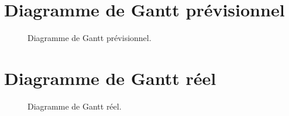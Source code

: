\documentclass[a4paper]{article}%
\begin{document}
\clearpage{}
\section{Diagramme de Gantt prévisionnel}\label{appendix:expectedgantt}

\begin{figure}[h!]
  \begin{center}
  \caption{Diagramme de Gantt prévisionnel.}
  \end{center}
\end{figure}

\clearpage{}
\section{Diagramme de Gantt réel}\label{appendix:realgantt}

\begin{figure}[h!]
  \begin{center}
  \caption{Diagramme de Gantt réel.}
  \end{center}
\end{figure}
\end{document}
